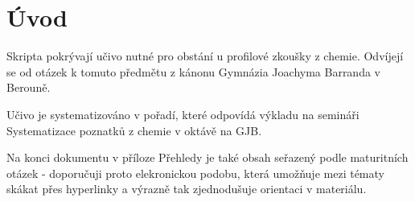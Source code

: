 \section{Úvod}
    Skripta pokrývají učivo nutné pro obstání u profilové zkoušky z chemie. Odvíjejí se od otázek k tomuto předmětu z kánonu Gymnázia Joachyma Barranda v Berouně.

    Učivo je systematizováno v pořadí, které odpovídá výkladu na semináři Systematizace poznatků z chemie v oktávě na GJB. 

    Na konci dokumentu v příloze Přehledy je také obsah seřazený podle maturitních otázek - doporučuji proto elekronickou podobu, která umožňuje mezi tématy skákat přes hyperlinky a výrazně tak zjednodušuje orientaci v materiálu.
